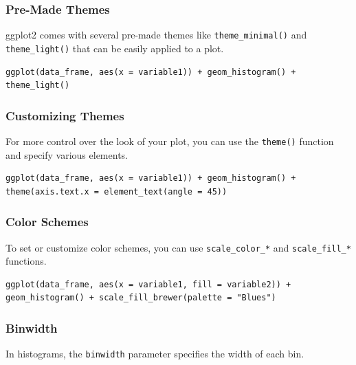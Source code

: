 \documentclass[
]{book}
\begin{document}
\hypertarget{pre-made-themes}{%
\subsubsection*{Pre-Made Themes}\label{pre-made-themes}}

ggplot2 comes with several pre-made themes like \texttt{theme\_minimal()} and \texttt{theme\_light()} that can be easily applied to a plot.

\begin{verbatim}
ggplot(data_frame, aes(x = variable1)) + geom_histogram() + theme_light()
\end{verbatim}

\hypertarget{customizing-themes}{%
\subsubsection*{Customizing Themes}\label{customizing-themes}}

For more control over the look of your plot, you can use the \texttt{theme()} function and specify various elements.

\begin{verbatim}
ggplot(data_frame, aes(x = variable1)) + geom_histogram() + theme(axis.text.x = element_text(angle = 45))
\end{verbatim}

\hypertarget{color-schemes}{%
\subsubsection*{Color Schemes}\label{color-schemes}}

To set or customize color schemes, you can use \texttt{scale\_color\_*} and \texttt{scale\_fill\_*} functions.

\begin{verbatim}
ggplot(data_frame, aes(x = variable1, fill = variable2)) + geom_histogram() + scale_fill_brewer(palette = "Blues")
\end{verbatim}

\hypertarget{binwidth}{%
\subsubsection*{Binwidth}\label{binwidth}}

In histograms, the \texttt{binwidth} parameter specifies the width of each bin.
\end{document}
